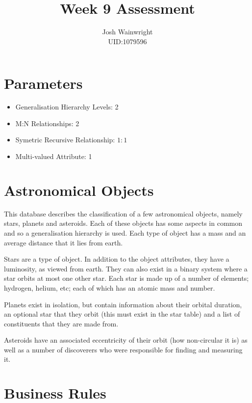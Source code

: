 \documentclass[11pt]{article} %
\author{Josh Wainwright \\ UID:1079596}
\title{Week 9 Assessment}
\date{}
\begin{document}
\maketitle
\section{Parameters}
\begin{itemize}
	\item Generalisation Hierarchy Levels: 2
	\item M:N Relationships: 2
	\item Symetric Recursive Relationship: $1:1$
	\item Multi-valued Attribute: 1
\end{itemize}

\section{Astronomical Objects}
This database describes the classification of a few astronomical objects,
namely stars, planets and asteroids. Each of these objects has some aspects in
common and so a generalisation hierarchy is used. Each type of object has a
mass and an average distance that it lies from earth.

Stars are a type of object. In addition to the object attributes, they have a
luminosity, as viewed from earth. They can also exist in a binary system where
a star orbits at most one other star. Each star is made up of a number of
elements; hydrogen, helium, etc; each of which has an atomic mass and number.

Planets exist in isolation, but contain information about their orbital
duration, an optional star that they orbit (this must exist in the star table)
and a list of constituents that they are made from.

Asteroids have an associated eccentricity of their orbit (how non-circular it
is) as well as a number of discoverers who were responsible for finding and
measuring it.

\section{Business Rules}
\end{document}
